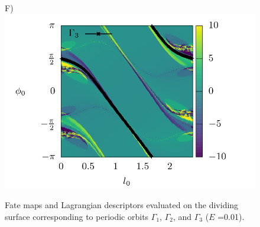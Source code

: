 \documentclass[10pt,aps,onecolumn,superscriptaddress]{revtex4-2}
\begin{document}
\begin{figure}[htbp]
	F)\includegraphics[scale=0.35]{ld_action_ds_gamma3_E_001.png}
	\caption{ Fate maps and Lagrangian descriptors evaluated on the dividing surface corresponding to periodic orbits $\Gamma_1$, $\Gamma_2$, and $\Gamma_3$ ($E$ =0.01). }
	\label{fig:ld_fm_ds}
\end{figure}
\end{document}
